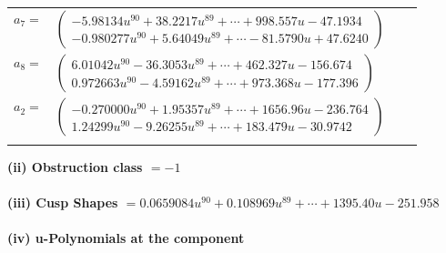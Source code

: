 \documentclass[1p]{elsarticle_modified}
\theoremstyle{definition}
\begin{document}
\begin{tabular}{m{7pt} m{180pt} m{7pt} m{180pt} }
\flushright $a_{7}=$&$\begin{pmatrix}-5.98134 u^{90}+38.2217 u^{89}+\cdots+998.557 u-47.1934\\-0.980277 u^{90}+5.64049 u^{89}+\cdots-81.5790 u+47.6240\end{pmatrix}$ \\
\flushright $a_{8}=$&$\begin{pmatrix}6.01042 u^{90}-36.3053 u^{89}+\cdots+462.327 u-156.674\\0.972663 u^{90}-4.59162 u^{89}+\cdots+973.368 u-177.396\end{pmatrix}$ \\
\flushright $a_{2}=$&$\begin{pmatrix}-0.270000 u^{90}+1.95357 u^{89}+\cdots+1656.96 u-236.764\\1.24299 u^{90}-9.26255 u^{89}+\cdots+183.479 u-30.9742\end{pmatrix}$\\&\end{tabular}
\flushleft \textbf{(ii) Obstruction class $= -1$}\\~\\
\flushleft \textbf{(iii) Cusp Shapes $= 0.0659084 u^{90}+0.108969 u^{89}+\cdots+1395.40 u-251.958$}\\~\\
\newpage\renewcommand{\arraystretch}{1}
\flushleft \textbf{(iv) u-Polynomials at the component}\newline \\
\end{document}
